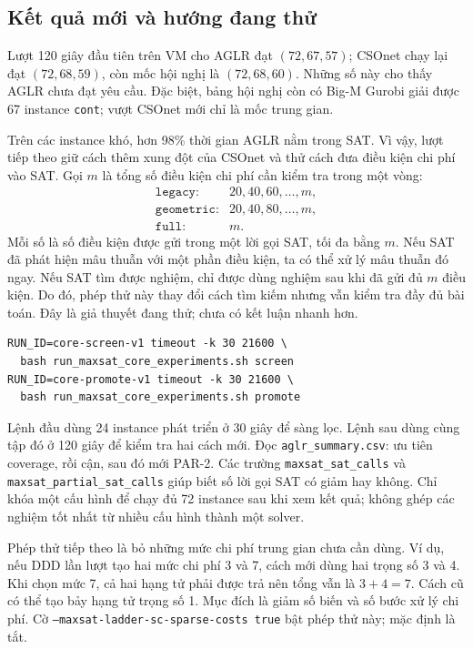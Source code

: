 \documentclass[11pt,a4paper]{article}
\newcommand{\code}[1]{\texttt{#1}}
\newcommand{\file}[1]{\nolinkurl{#1}}
\begin{document}
\subsection{Kết quả mới và hướng đang thử}

Lượt 120 giây đầu tiên trên VM cho AGLR đạt $(72,67,57)$; CSOnet chạy lại
đạt $(72,68,59)$, còn mốc hội nghị là $(72,68,60)$. Những số này cho thấy
AGLR chưa đạt yêu cầu. Đặc biệt, bảng hội nghị còn có Big-M Gurobi giải được
67 instance \code{cont}; vượt CSOnet mới chỉ là mốc trung gian.

Trên các instance khó, hơn 98\% thời gian AGLR nằm trong SAT. Vì vậy, lượt
tiếp theo giữ cách thêm xung đột của CSOnet và thử cách đưa điều kiện chi phí
vào SAT. Gọi $m$ là tổng số điều kiện chi phí cần kiểm tra trong một vòng:
\[
\begin{array}{ll}
\texttt{legacy}: & 20,40,60,\ldots,m,\\
\texttt{geometric}: & 20,40,80,\ldots,m,\\
\texttt{full}: & m.
\end{array}
\]
Mỗi số là số điều kiện được gửi trong một lời gọi SAT, tối đa bằng $m$.
Nếu SAT đã phát hiện mâu thuẫn với một phần điều kiện, ta có thể xử lý mâu
thuẫn đó ngay. Nếu SAT tìm được nghiệm, chỉ được dùng nghiệm sau khi đã gửi
đủ $m$ điều kiện. Do đó, phép thử này thay đổi cách tìm kiếm nhưng vẫn kiểm
tra đầy đủ bài toán. Đây là giả thuyết đang thử; chưa có kết luận nhanh hơn.

\begin{verbatim}
RUN_ID=core-screen-v1 timeout -k 30 21600 \
  bash run_maxsat_core_experiments.sh screen
RUN_ID=core-promote-v1 timeout -k 30 21600 \
  bash run_maxsat_core_experiments.sh promote
\end{verbatim}

Lệnh đầu dùng 24 instance phát triển ở 30 giây để sàng lọc. Lệnh sau dùng
cùng tập đó ở 120 giây để kiểm tra hai cách mới. Đọc
\file{aglr_summary.csv}: ưu tiên coverage, rồi cận, sau đó mới PAR-2. Các trường
\code{maxsat\_sat\_calls} và \code{maxsat\_partial\_sat\_calls} giúp biết
số lời gọi SAT có giảm hay không. Chỉ khóa một cấu hình để chạy đủ 72
instance sau khi xem kết quả; không ghép các nghiệm tốt nhất từ nhiều cấu
hình thành một solver.

Phép thử tiếp theo là bỏ những mức chi phí trung gian chưa cần dùng. Ví dụ,
nếu DDD lần lượt tạo hai mức chi phí 3 và 7, cách mới dùng hai trọng số 3 và
4. Khi chọn mức 7, cả hai hạng tử phải được trả nên tổng vẫn là $3+4=7$.
Cách cũ có thể tạo bảy hạng tử trọng số 1. Mục đích là giảm số biến và số
bước xử lý chi phí. Cờ \code{--maxsat-ladder-sc-sparse-costs true} bật phép
thử này; mặc định là tắt.
\end{document}
